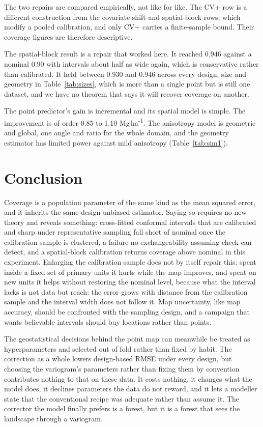 \documentclass[preprint,12pt,authoryear]{elsarticle}
\newcommand{\Mgha}{Mg\,ha\textsuperscript{-1}}
\begin{document}
The two repairs are compared empirically, not like for like. The CV+ row is a
different construction from the covariate-shift and spatial-block rows, which
modify a pooled calibration, and only CV+ carries a finite-sample bound. Their
coverage figures are therefore descriptive.

The spatial-block result is a repair that worked here. It reached $0.946$
against a nominal $0.90$ with intervals about half as wide again, which is
conservative rather than calibrated. It held between $0.930$ and $0.946$ across
every design, size and geometry in Table~\ref{tab:sizes}, which is more than a
single point but is still one dataset, and we have no theorem that says it will
recover coverage on another.

The point predictor's gain is incremental and its spatial model is simple. The
improvement is of order 0.85 to 1.10 \Mgha{}. The anisotropy model is geometric
and global, one angle and ratio for the whole domain, and the geometry estimator
has limited power against mild anisotropy (Table~\ref{tab:sim1}).

\section{Conclusion}

Coverage is a population parameter of the same kind as the mean squared error,
and it inherits the same design-unbiased estimator. Saying so requires no new
theory and
reveals something: cross-fitted conformal intervals that are calibrated and
sharp under representative sampling fall short of nominal once the
calibration sample is clustered, a failure no exchangeability-assuming check can detect, and
a spatial-block calibration returns coverage above nominal in this experiment.
Enlarging the calibration sample does not by itself repair this: spent inside a
fixed set of primary units it hurts while the map improves, and spent on new
units it helps without restoring the nominal level, because what the interval
lacks is not data but reach: the error grows with distance from the calibration sample and the
interval width does not follow it. Map uncertainty, like map accuracy, should be
confronted with the sampling design, and a campaign that wants believable
intervals should buy locations rather than points.

The geostatistical decisions behind the point map can meanwhile be treated as
hyperparameters and selected out of fold rather than fixed by habit. The
correction as a whole lowers design-based RMSE under every design, but choosing
the variogram's parameters rather than fixing them by convention contributes
nothing to that on these data. It costs
nothing, it changes what the model does, it declines parameters the data do not
reward, and it lets a modeller state that the conventional recipe was adequate
rather than assume it. The corrector the model finally prefers is a
forest, but it is a forest that sees the landscape through a variogram.
\end{document}
